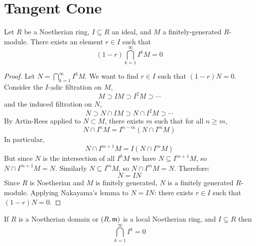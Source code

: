 \documentclass[12pt]{amsproc}
\begin{document}


    \section{Tangent Cone}

    \begin{theorem}
        Let $R$ be a Noetherian ring, $I \subseteq R$ an ideal, and $M$ a finitely-generated $R$-module. There exists an element $r \in I$ such that \[(1-r) \bigcap_{k=1}^\infty I^kM = 0\]
    \end{theorem}

    \begin{proof}

        Let $N = \bigcap_{k=1}^\infty I^k M$. We want to find $r \in I$ such 
        that $(1-r)N = 0$. Consider the $I$-adic filtration on $M$, 
        \[M \supset IM \supset I^2M \supset \cdots\]
        and the induced filtration on $N$, 
        \[N \supset N \cap IM \supset N \cap I^2M \supset \cdots\]
        By Artin-Rees applied to $N \subset M$, there exists $m$ such that for 
        all $n \geq m$, 
        \[N \cap I^n M = I^{n-m}(N \cap I^m M)\]
        In particular, 
        \[N \cap I^{m+1}M = I(N \cap I^m M)\]
        But since $N$ is the intersection of all $I^kM$ we have $N \subseteq I^{m+1}M$, so $N \cap 
        I^{m+1}M = N$. Similarly $N \subseteq I^m M$, so $N \cap I^m M = N$. 
        Therefore:
        \[N = IN\]
        Since $R$ is Noetherian and $M$ is finitely generated, $N$ is a 
        finitely generated $R$-module. Applying Nakayama's lemma to $N = IN$: 
        there exists $r \in I$ such that $(1-r)N = 0$.
    \end{proof}

    \begin{corollary}
        If $R$ is a Noetherian domain or $(R, \operatorname{\mathfrak{m}})$ is a local Noetherian ring, and $I \subsetneq R$ then 
        \[\bigcap_{k=1}^\infty I^k = 0\]
    \end{corollary}
\end{document}
